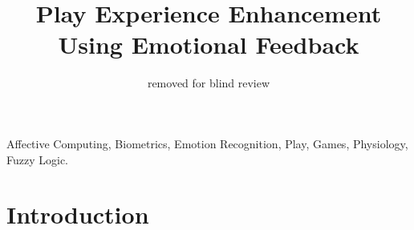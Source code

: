 \documentclass[conference]{IEEEtran}
\begin{document}

\title{Play Experience Enhancement Using Emotional Feedback}

\author{\IEEEauthorblockN
{removed for blind review}
}

\maketitle


\begin{abstract}
\label{sec:abs}
\end{abstract}

\begin{IEEEkeywords}
Affective Computing, Biometrics, Emotion Recognition, Play, Games, Physiology, Fuzzy Logic.
\end{IEEEkeywords}

\IEEEpeerreviewmaketitle


\section{Introduction}
\label{sec:intro}
\end{document}
